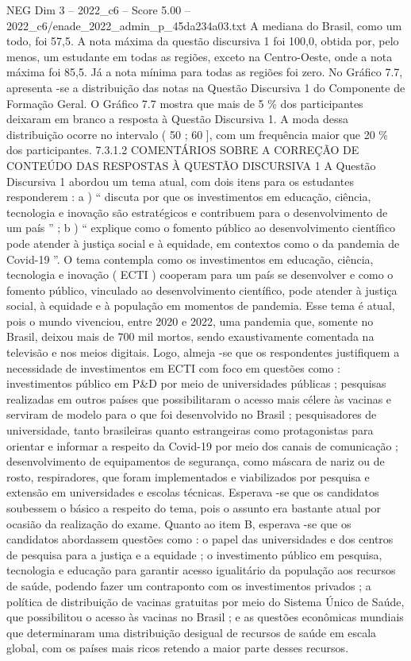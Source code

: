 \begin{textsample}{NEG Dim 3 – 2022\_c6 – Score 5.00 – 2022\_c6/enade\_2022\_admin\_p\_45da234a03.txt}
A mediana do Brasil, como um todo, foi 57,5.
A nota máxima da questão discursiva 1 foi 100,0, obtida por, pelo menos, um estudante em todas as regiões, exceto na Centro-Oeste, onde a nota máxima foi 85,5.
Já a nota mínima para todas as regiões foi zero.
No Gráfico 7.7, apresenta -se a distribuição das notas na Questão Discursiva 1 do Componente de Formação Geral.
O Gráfico 7.7 mostra que mais de 5 \% dos participantes deixaram em branco a resposta à Questão Discursiva 1.
A moda dessa distribuição ocorre no intervalo ( 50 ; 60 ], com um frequência maior que 20 \% dos participantes. 7.3.1.2 COMENTÁRIOS SOBRE A CORREÇÃO DE CONTEÚDO DAS RESPOSTAS À QUESTÃO DISCURSIVA 1 A Questão Discursiva 1 abordou um tema atual, com dois itens para os estudantes responderem : a ) “ discuta por que os investimentos em educação, ciência, tecnologia e inovação são estratégicos e contribuem para o desenvolvimento de um país ” ; b ) “ explique como o fomento público ao desenvolvimento científico pode atender à justiça social e à equidade, em contextos como o da pandemia de Covid-19 ”.
O tema contempla como os investimentos em educação, ciência, tecnologia e inovação ( ECTI ) cooperam para um país se desenvolver e como o fomento público, vinculado ao desenvolvimento científico, pode atender à justiça social, à equidade e à população em momentos de pandemia.
Esse tema é atual, pois o mundo vivenciou, entre 2020 e 2022, uma pandemia que, somente no Brasil, deixou mais de 700 mil mortos, sendo exaustivamente comentada na televisão e nos meios digitais.
Logo, almeja -se que os respondentes justifiquem a necessidade de investimentos em ECTI com foco em questões como : investimentos público em P\&D por meio de universidades públicas ; pesquisas realizadas em outros países que possibilitaram o acesso mais célere às vacinas e serviram de modelo para o que foi desenvolvido no Brasil ; pesquisadores de universidade, tanto brasileiras quanto estrangeiras como protagonistas para orientar e informar a respeito da Covid-19 por meio dos canais de comunicação ; desenvolvimento de equipamentos de segurança, como máscara de nariz ou de rosto, respiradores, que foram implementados e viabilizados por pesquisa e extensão em universidades e escolas técnicas.
Esperava -se que os candidatos soubessem o básico a respeito do tema, pois o assunto era bastante atual por ocasião da realização do exame.
Quanto ao item B, esperava -se que os candidatos abordassem questões como : o papel das universidades e dos centros de pesquisa para a justiça e a equidade ; o investimento público em pesquisa, tecnologia e educação para garantir acesso igualitário da população aos recursos de saúde, podendo fazer um contraponto com os investimentos privados ; a política de distribuição de vacinas gratuitas por meio do Sistema Único de Saúde, que possibilitou o acesso às vacinas no Brasil ; e as questões econômicas mundiais que determinaram uma distribuição desigual de recursos de saúde em escala global, com os países mais ricos retendo a maior parte desses recursos.

\end{textsample}
